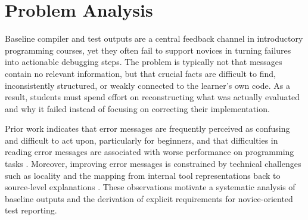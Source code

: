 \chapter{Problem Analysis} %
  \label{Problem Analysis} %


\improve


\begin{justify}
Baseline compiler and test outputs are a central feedback channel in introductory programming courses,
yet they often fail to support novices in turning failures into actionable debugging steps.
The problem is typically not that messages contain no relevant information, but that crucial facts are difficult to find,
inconsistently structured, or weakly connected to the learner's own code. As a result, students must spend effort on reconstructing
what was actually evaluated and why it failed instead of focusing on correcting their implementation.

Prior work indicates that error messages are frequently perceived as confusing and difficult to act upon, particularly for beginners,
and that difficulties in reading error messages are associated with worse performance on programming tasks \cite{becker, barik}.
Moreover, improving error messages is constrained by technical challenges such as locality and the mapping from internal tool representations
back to source-level explanations \cite{becker}. These observations motivate a systematic analysis of baseline outputs and the derivation
of explicit requirements for novice-oriented test reporting.
\end{justify}

